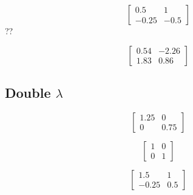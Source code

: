 \documentclass[12pt]{article}
\begin{document}
\[
\begin{bmatrix}
    0.5 & 1 \\
    -0.25 & -0.5
\end{bmatrix}
\]??

\[
\begin{bmatrix}
    0.54 & -2.26 \\
    1.83 & 0.86
\end{bmatrix}
\]

\subsection{Double $\lambda$}

\[
\begin{bmatrix}
    1.25 & 0 \\
    0 & 0.75
\end{bmatrix}
\]

\[
\begin{bmatrix}
    1 & 0 \\
    0 & 1
\end{bmatrix}
\]

\[
\begin{bmatrix}
    1.5 & 1 \\
    -0.25 & 0.5
\end{bmatrix}
\]

\section{}
\end{document}
